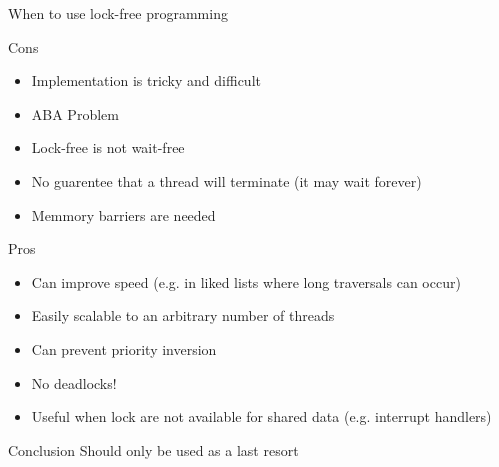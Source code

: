 \begin{frame}[allowframebreaks]{When to use lock-free programming}
    \begin{block}{Cons}
    \begin{itemize}
        \item Implementation is tricky and difficult
        \item ABA Problem
        \item Lock-free is not wait-free
        \item No guarentee that a thread will terminate (it may wait forever)
        \item Memmory barriers are needed
    \end{itemize}
    \end{block}

    \begin{block}{Pros}
    \begin{itemize}
        \item Can improve speed (e.g. in liked lists where long traversals can occur)
        \item Easily scalable to an arbitrary number of threads
        \item Can prevent priority inversion
        \item \textcolor{ReneOrange}{No deadlocks!}
        \item Useful when lock are not available for shared data (e.g. interrupt handlers)
    \end{itemize}
    \end{block}
    
    \begin{exampleblock}{Conclusion}
        Should only be used as a last resort
    \end{exampleblock}
\end{frame}
